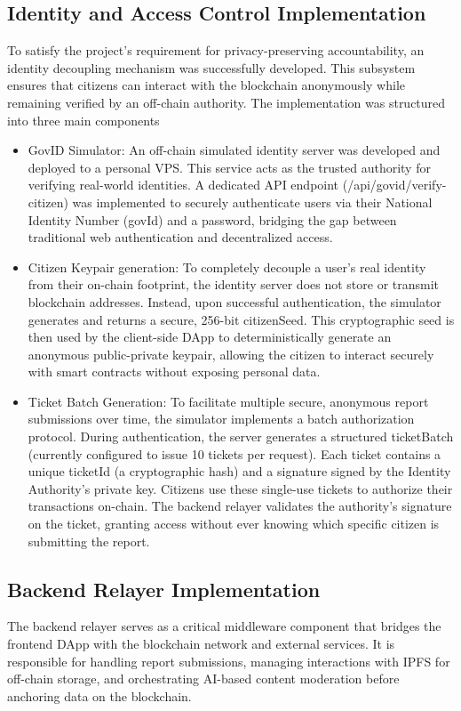 \subsection{Identity and Access Control Implementation}

To satisfy the project's requirement for privacy-preserving accountability, an identity decoupling mechanism was successfully developed. This subsystem ensures that citizens can interact with the blockchain anonymously while remaining verified by an off-chain authority. The implementation was structured into three main components

\begin{itemize}
    \item {GovID Simulator:} An off-chain simulated identity server was developed and deployed to a personal \ac{VPS}. This service acts as the trusted authority for verifying real-world identities. A dedicated API endpoint (/api/govid/verify-citizen) was implemented to securely authenticate users via their National Identity Number (govId) and a password, bridging the gap between traditional web authentication and decentralized access.
    \item {Citizen Keypair generation:} To completely decouple a user's real identity from their on-chain footprint, the identity server does not store or transmit blockchain addresses. Instead, upon successful authentication, the simulator generates and returns a secure, 256-bit citizenSeed. This cryptographic seed is then used by the client-side DApp to deterministically generate an anonymous public-private keypair, allowing the citizen to interact securely with smart contracts without exposing personal data.
    \item {Ticket Batch Generation:} To facilitate multiple secure, anonymous report submissions over time, the simulator implements a batch authorization protocol. During authentication, the server generates a structured ticketBatch (currently configured to issue 10 tickets per request). Each ticket contains a unique ticketId (a cryptographic hash) and a signature signed by the Identity Authority's private key. Citizens use these single-use tickets to authorize their transactions on-chain. The backend relayer validates the authority's signature on the ticket, granting access without ever knowing which specific citizen is submitting the report.
\end{itemize}

\subsection{Backend Relayer Implementation}
The backend relayer serves as a critical middleware component that bridges the frontend DApp with the blockchain network and external services. It is responsible for handling report submissions, managing interactions with IPFS for off-chain storage, and orchestrating AI-based content moderation before anchoring data on the blockchain.

